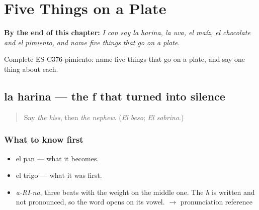 
\chapter{Five Things on a Plate}
\label{ch:la-harina-y-la-uva}

\begin{chapteropening}
\textbf{By the end of this chapter:} \emph{I can say la harina, la uva, el maíz, el chocolate and el pimiento, and name five things that go on a plate.}

Complete ES-C376-pimiento: name five things that go on a plate, and say one thing about each.
\end{chapteropening}

\section[la harina]{la harina — the f that turned into silence}

\label{lesson:ES-C376-harina}



\begin{quote}
Say \emph{the kiss}, then \emph{the nephew}. (\emph{El beso}; \emph{El sobrino}.)
\end{quote}

\subsection*{What to know first}
\begin{itemize}
\raggedright
  \item el pan — what it becomes.
  \item el trigo — what it was first.
\end{itemize}

\begin{sounds}
\begin{itemize}
\raggedright
  \item \emph{a-RI-na}, three beats with the weight on the middle one. The \emph{h} is written and not pronounced, so the word opens on its vowel. $\to$ pronunciation reference
\end{itemize}
\end{sounds}

